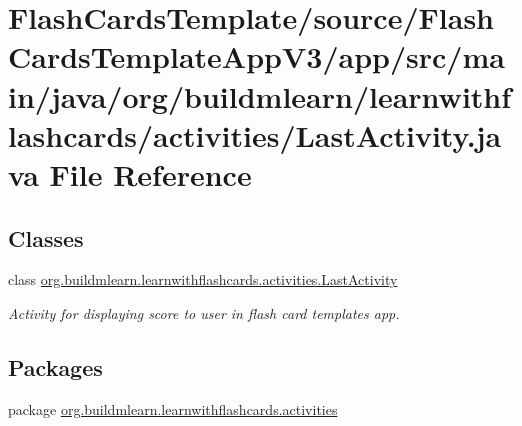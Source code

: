 \hypertarget{FlashCardsTemplate_2source_2FlashCardsTemplateAppV3_2app_2src_2main_2java_2org_2buildmlearn_2lea6ad963c681738c6ce4637dba1172a936}{}\section{Flash\+Cards\+Template/source/\+Flash\+Cards\+Template\+App\+V3/app/src/main/java/org/buildmlearn/learnwithflashcards/activities/\+Last\+Activity.java File Reference}
\label{FlashCardsTemplate_2source_2FlashCardsTemplateAppV3_2app_2src_2main_2java_2org_2buildmlearn_2lea6ad963c681738c6ce4637dba1172a936}
\subsection*{Classes}
\begin{DoxyCompactItemize}
\item 
class \hyperlink{classorg_1_1buildmlearn_1_1learnwithflashcards_1_1activities_1_1LastActivity}{org.\+buildmlearn.\+learnwithflashcards.\+activities.\+Last\+Activity}
\begin{DoxyCompactList}\small\item\em Activity for displaying score to user in flash card template\textquotesingle{}s app. \end{DoxyCompactList}\end{DoxyCompactItemize}
\subsection*{Packages}
\begin{DoxyCompactItemize}
\item 
package \hyperlink{namespaceorg_1_1buildmlearn_1_1learnwithflashcards_1_1activities}{org.\+buildmlearn.\+learnwithflashcards.\+activities}
\end{DoxyCompactItemize}
